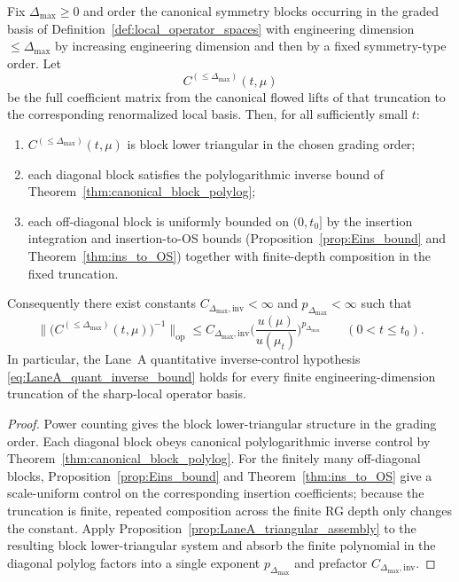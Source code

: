 \begin{theorem}\label{thm:finite_truncation_inverse_control}
Fix $\Delta_{\max}\ge 0$ and order the canonical symmetry blocks occurring in the graded basis of Definition~\ref{def:local_operator_spaces}
with engineering dimension $\le \Delta_{\max}$ by increasing engineering dimension and then by a fixed symmetry-type order.
Let
\[
C^{(\le \Delta_{\max})}(t,\mu)
\]
be the full coefficient matrix from the canonical flowed lifts of that truncation to the corresponding renormalized local basis.
Then, for all sufficiently small $t$:
\begin{enumerate}[label=(\roman*),leftmargin=2.3em]
\item $C^{(\le \Delta_{\max})}(t,\mu)$ is block lower triangular in the chosen grading order;
\item each diagonal block satisfies the polylogarithmic inverse bound of Theorem~\ref{thm:canonical_block_polylog};
\item each off-diagonal block is uniformly bounded on $(0,t_0]$ by the insertion integration and insertion-to-OS bounds (Proposition~\ref{prop:Eins_bound} and Theorem~\ref{thm:ins_to_OS}) together with finite-depth composition in the fixed truncation.
\end{enumerate}
Consequently there exist constants $C_{\Delta_{\max},\mathrm{inv}}<\infty$ and $p_{\Delta_{\max}}<\infty$ such that
\begin{equation}\label{eq:finite_truncation_polylog}
\big\|\big(C^{(\le \Delta_{\max})}(t,\mu)\big)^{-1}\big\|_{\mathrm{op}}
\le
C_{\Delta_{\max},\mathrm{inv}}
\Big(\frac{u(\mu)}{u(\mu_t)}\Big)^{p_{\Delta_{\max}}}
\qquad (0<t\le t_0).
\end{equation}
In particular, the Lane~A quantitative inverse-control hypothesis \eqref{eq:LaneA_quant_inverse_bound} holds for every finite engineering-dimension truncation of the sharp-local operator basis.
\end{theorem}

\begin{proof}
Power counting gives the block lower-triangular structure in the grading order.
Each diagonal block obeys canonical polylogarithmic inverse control by Theorem~\ref{thm:canonical_block_polylog}.
For the finitely many off-diagonal blocks, Proposition~\ref{prop:Eins_bound} and Theorem~\ref{thm:ins_to_OS} give a scale-uniform control on the corresponding insertion coefficients; because the truncation is finite, repeated composition across the finite RG depth only changes the constant.
Apply Proposition~\ref{prop:LaneA_triangular_assembly} to the resulting block lower-triangular system and absorb the finite polynomial in the diagonal polylog factors into a single exponent $p_{\Delta_{\max}}$ and prefactor $C_{\Delta_{\max},\mathrm{inv}}$.
\end{proof}

